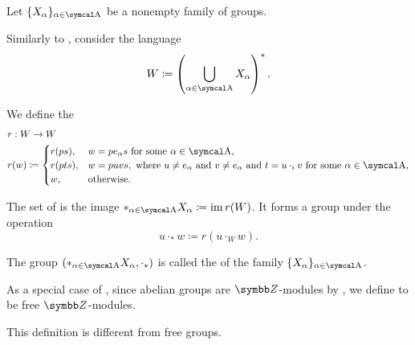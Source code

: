 \begin{definition}\label{def:group_free_product}\cite[323]{Knapp2016BAlg}
  Let \( \{ X_\al \}_{\al \in \CA} \) be a nonempty family of groups.

  Similarly to , consider the language
  \begin{equation*}
    W \coloneqq \left( \bigcup_{\al \in \CA} X_\al \right)^{*}.
  \end{equation*}

  We define the 
  \begin{align*}
    &r: W \to W \\
    &r(w) \coloneqq \begin{cases}
      r(ps), &w = p e_\al s \text{ for some } \al \in \CA, \\
      r(pts), &w = puvs, \text{ where } u \neq e_\al \text{ and } v \neq e_\al \text{ and } t = u \cdot_i v \text{ for some } \al \in \CA, \\
      w, &\text{otherwise}.
    \end{cases}
  \end{align*}

  The set of  is the image \( \ast_{\al \in \CA} X_\al \coloneqq \Img r(W) \). It forms a group under the operation
  \begin{equation*}
    u \cdot_\ast w \coloneqq r(u \cdot_{W} w).
  \end{equation*}

  The group \( (\ast_{\al \in \CA} X_\al, \cdot_\ast) \) is called the  of the family \( \{ X_\al \}_{\al \in \CA} \).
\end{definition}

\begin{definition}\label{def:free_abelian_group}
  As a special case of , since abelian groups are \( \BZ \)-modules by , we define  to be free \( \BZ \)-modules.

  This definition is different from free groups.
\end{definition}

